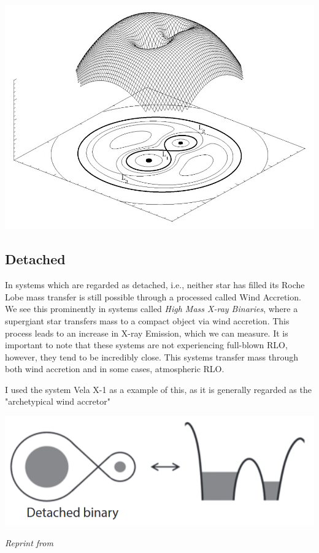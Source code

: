 \documentclass[12pt, letterpaper]{article}
\begin{document}
    \includegraphics[width=\textwidth]{Figs/RochePotential.jpg}

        \subsection{\centering Detached}
        In systems which are regarded as detached, i.e., neither star has filled its Roche Lobe mass transfer is still possible through a processed called Wind Accretion. We see this prominently in systems called \textit{High Mass X-ray Binaries}, where a supergiant star transfers mass to a compact object via wind accretion. This process leads to an increase in X-ray Emission, which we can measure.  \cite{TaurisvandenHeuvel+2023} It is important to note that these systems are not experiencing full-blown RLO, however, they tend to be incredibly close. \cite{TaurisvandenHeuvel+2023} This systems transfer mass through both wind accretion and in some cases, atmospheric RLO.

        I used the system Vela X-1 \cite{Kretschmar_2021} as a example of this, as it is generally regarded as the "archetypical wind accretor" \cite{Kretschmar_2021} 
        
        \begin{center}
            \includegraphics[scale = .4]{Figs/Detached binary.png}

            \textit{Reprint from \cite{TaurisvandenHeuvel+2023}}
        \end{center}
        
\end{document}
